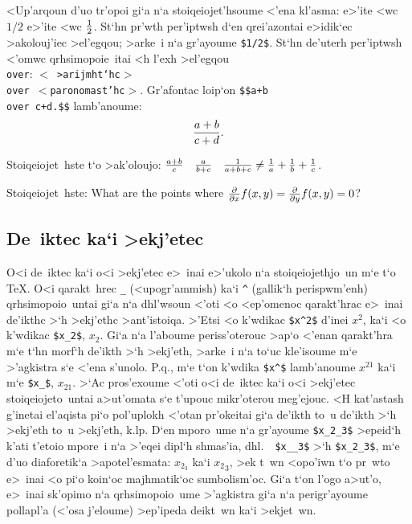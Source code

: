 <Up'arqoun d'uo tr'opoi gi`a n`a stoiqeiojet'hsoume <'ena kl'asma:
e>'ite <wc $1/2$ e>'ite <wc ${1\over2}$\null.  St`hn pr'wth per'iptwsh
d`en qrei'azontai e>idik`ec >akolouj'iec >el'egqou; >arke~i n`a
gr'ayoume {\tt \$1/2\$}\null.  St`hn de'uterh per'iptwsh <'omwc
qrhsimopoie~itai <h l'exh >el'egqou {\tt \\over}: {\tt\lb $<${\tengs
>arijmht`hc\/}$>$ \\over $<${\tengs paronomast'hc\/}$>$\rb}\null.
Gr'afontac loip`on {\tt \$\$\lb a+b \\over c+d\rb.\$\$} lamb'anoume:%
$${a+b\over c+d}.$$

\exercise Stoiqeiojet~hste t`o >ak'oloujo: ${a+b\over c}\quad {a\over
b+c} \quad {1\over a+b+c} \not= {1\over a}+{1\over b}+{1\over c}$.

\exercise Stoiqeiojet~hste: {\rm What are the points where ${\partial
\over \partial x} f(x,y) = {\partial \over \partial y} f(x,y) = 0$?}
      
\subsection{De~iktec ka`i >ekj'etec}

O<i de~iktec ka`i o<i >ekj'etec e>~inai e>'ukolo n`a stoiqeiojethjo~un
m`e t`o {\rm \TeX}\null.  O<i qarakt~hrec {\tt \_{}} (<upogr'ammish)
ka`i {\tt \^{}} (gallik`h perispwm'enh) qrhsimopoio~untai gi`a n`a
dhl'wsoun <'oti <o <ep'omenoc qarakt'hrac e>~inai de'ikthc >`h >ekj'ethc
>ant'istoiqa. >'Etsi <o k'wdikac {\tt \$x\^{}2\$} d'inei $x^2$, ka`i <o
k'wdikac {\tt \$x\_{}2\$}, $x_2$\null.   Gi`a n`a l'aboume
periss'oterouc >ap`o <'enan qarakt'hra m`e t`hn morf`h de'ikth >`h
>ekj'eth, >arke~i n`a to`uc kle'isoume m`e >'agkistra s`e <'ena s'unolo.
P.q., m`e t`on k'wdika {\tt \$x\^{}\rb\$} lamb'anoume $x^{21}$
ka`i m`e {\tt \$x\_{}\rb\$}, $x_{21}$\null. >`Ac pros'exoume <'oti
o<i de~iktec ka`i o<i >ekj'etec stoiqeiojeto~untai a>ut'omata s`e
t'upouc mikr'oterou meg'ejouc.  <H kat'astash g'inetai el'aqista pi`o
pol'uplokh <'otan pr'okeitai gi`a de'ikth to~u de'ikth >`h >ekj'eth to~u
>ekj'eth, k.lp.  D`en mporo~ume n`a gr'ayoume {\tt \$x\_{}2\_{}3\$}
>epeid`h k'ati t'etoio mpore~i n`a >'eqei dipl`h shmas'ia, dhl.\ {\tt
\$x\_{}\_{}3\rb\$} >`h  {\tt \$\lb x\_{}2\rb\_{}3\$}, m`e d'uo     
diaforetik`a >apotel'esmata: $x_{2_3}$ ka`i ${x_2}_3$, >ek t~wn <opo'iwn
t`o pr~wto e>~inai <o pi`o koin`oc majhmatik`oc sumbolism'oc. Gi`a t`on
l'ogo a>ut'o, e>~inai sk'opimo n`a qrhsimopoio~ume >'agkistra gi`a n`a
perigr'ayoume pollapl'a (<'osa j'eloume) >ep'ipeda deikt~wn ka`i
>ekjet~wn.%


